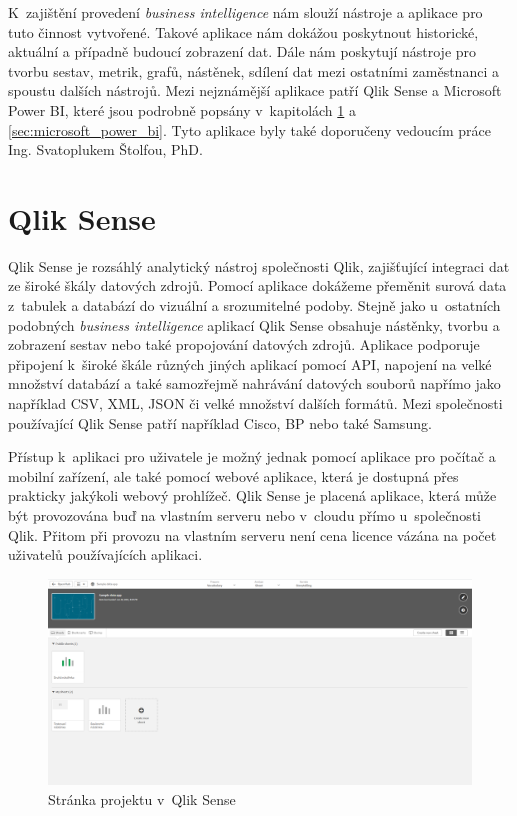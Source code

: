 \documentclass[czech,master]{diploma}
\begin{document}
K~zajištění provedení \textit{business intelligence} nám slouží nástroje a aplikace pro tuto činnost vytvořené. Takové aplikace nám dokážou poskytnout historické, aktuální a případně budoucí zobrazení dat. Dále nám poskytují nástroje pro tvorbu sestav, metrik, grafů, nástěnek, sdílení dat mezi ostatními zaměstnanci a spoustu dalších nástrojů. Mezi nejznámější aplikace patří Qlik Sense a Microsoft Power BI, které jsou podrobně popsány v~kapitolách \ref{sec:qlik} a \ref{sec:microsoft_power_bi}. Tyto aplikace byly také doporučeny vedoucím práce Ing. Svatoplukem Štolfou, PhD.

\section{Qlik Sense}
\label{sec:qlik}
Qlik Sense je rozsáhlý analytický nástroj společnosti Qlik, zajišťující integraci dat ze široké škály datových zdrojů. Pomocí aplikace dokážeme přeměnit surová data z~tabulek a databází do vizuální a srozumitelné podoby. Stejně jako u~ostatních podobných \textit{business intelligence} aplikací Qlik Sense obsahuje nástěnky, tvorbu a zobrazení sestav nebo také propojování datových zdrojů. Aplikace podporuje připojení k~široké škále různých jiných aplikací pomocí API, napojení na velké množství databází a také samozřejmě nahrávání datových souborů napřímo jako například CSV, XML, JSON či velké množství dalších formátů. Mezi společnosti používající Qlik Sense patří například Cisco, BP nebo také Samsung. \cite{ref:qlik_general}

Přístup k~aplikaci pro uživatele je možný jednak pomocí aplikace pro počítač a mobilní zařízení, ale také pomocí webové aplikace, která je dostupná přes prakticky jakýkoli webový prohlížeč. Qlik Sense je placená aplikace, která může být provozována buď na vlastním serveru nebo v~cloudu přímo u~společnosti Qlik. Přitom při provozu na vlastním serveru není cena licence vázána na počet uživatelů používajících aplikaci.

\begin{figure}[!ht]
    \centering
    \includegraphics[width=1\textwidth]{Diplomka/Figures/qlik_project.png}
    \caption{Stránka projektu v~Qlik Sense}
    \label{fig:qlik_project}
\end{figure}
\end{document}
